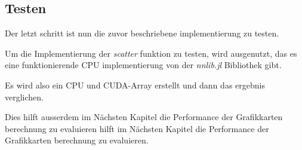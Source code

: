 \subsection{Testen}

Der letzt schritt ist nun die zuvor beschriebene implementierung zu testen.

Um die Implementierung der \textit{scatter} funktion zu testen, wird ausgenutzt,
das es eine funktionierende CPU implementierung von der \textit{nnlib.jl} Bibliothek gibt.

Es wird also ein CPU und CUDA-Array erstellt und dann das ergebnis verglichen.

Dies hilft ausserdem im Nächsten Kapitel die Performance der Grafikkarten berechnung zu evaluieren hilft im Nächsten Kapitel die Performance der Grafikkarten berechnung zu evaluieren.

